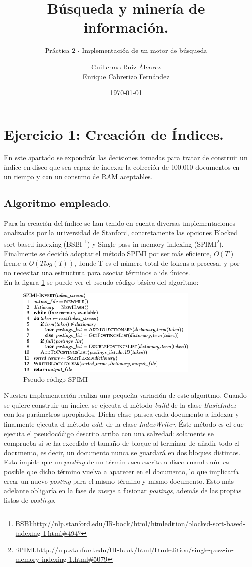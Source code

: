 \documentclass[spanish]{assignment}
\title{Búsqueda y minería de información.}
\subtitle{Práctica 2 - Implementación de un motor de búsqueda}
\author{Guillermo Ruiz Álvarez\\ Enrique Cabrerizo Fernández}
\date{\today}
\begin{document}
	\makepre
	\section{Ejercicio 1: Creación de Índices.}
	En este apartado se expondrán las decisiones tomadas para tratar de construir un índice en disco
	que sea capaz de indexar la colección de 100.000 documentos en un tiempo y con un consumo de RAM aceptables.
	
	\subsection{Algoritmo empleado.}
	Para la creación del índice se han tenido en cuenta diversas implementaciones analizadas por la universidad de Stanford, concretamente las opciones Blocked sort-based indexing (BSBI \footnote{BSBI:\url{http://nlp.stanford.edu/IR-book/html/htmledition/blocked-sort-based-indexing-1.html\#4947}})
	y Single-pass in-memory indexing (SPIMI\footnote{SPIMI:\url{http://nlp.stanford.edu/IR-book/html/htmledition/single-pass-in-memory-indexing-1.html\#5079}}).
	Finalmente se decidió adoptar el método SPIMI por ser más eficiente, $O(T)$ frente a $O(Tlog(T))$, donde T es el número total de tokens a procesar y por no necesitar una estructura para asociar términos a ids únicos.
	\\
	En la figura \ref{fig:spimi_pseudo} se puede ver el pseudo-c\'odigo b\'asico del algoritmo:
	\begin{figure}[h]
		\centering
		\includegraphics[width=0.8\textwidth]{SPIMI.png}
		\caption{Pseudo-c\'odigo SPIMI}
		\label{fig:spimi_pseudo}
	\end{figure}
	
	Nuestra implementación realiza una pequeña variaci\'on de este algoritmo.
	Cuando se quiere construir un \'indice, se ejecuta el m\'etodo \textit{build} de la clase \textit{BasicIndex} con los par\'ametros apropiados. Dicha clase parsea cada documento a indexar y finalmente ejecuta el método \textit{add}, de la clase \textit{IndexWriter}. Éste método es el que ejecuta el pseudocódigo descrito arriba con una salvedad: solamente se comprueba si se ha excedido el tamaño de bloque al terminar de añadir todo el documento, es decir, un documento nunca se guardará en dos bloques distintos. Esto impide que un \textit{posting} de un término sea escrito a disco cuando aún es posible que dicho t\'ermino vuelva a aparecer en el documento, lo que implicaría crear un nuevo \textit{posting} para el mismo término y mismo documento. Esto más adelante obligaría en la fase de \textit{merge} a fusionar \textit{postings}, además de las propias listas de \textit{postings}.
	
\end{document}
